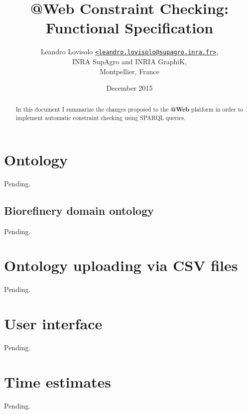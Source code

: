 \documentclass[a4paper, 10pt, twoside]{article}
\makeatletter
\newcommand{\atweb}{\textbf{@Web}\xspace}
\makeatother
\begin{document}
\title{
  \atweb Constraint Checking: \\
  Functional Specification
}
\author{
  Leandro Lovisolo
  \texttt{\href{mailto:leandro.lovisolo@supagro.inra.fr}
               {<leandro.lovisolo@supagro.inra.fr>}}, \\
  INRA SupAgro and INRIA GraphiK, \\
  Montpellier, France
}
\date{December 2015}

\maketitle

\begin{abstract}
  In this document I summarize the changes proposed to the \atweb platform in
  order to implement automatic constraint checking using SPARQL queries.
\end{abstract}


\section{Ontology}

Pending.

\subsection{Biorefinery domain ontology}

Pending.


\section{Ontology uploading via CSV files}

Pending.


\section{User interface}

Pending.


\section{Time estimates}

Pending.
\end{document}

